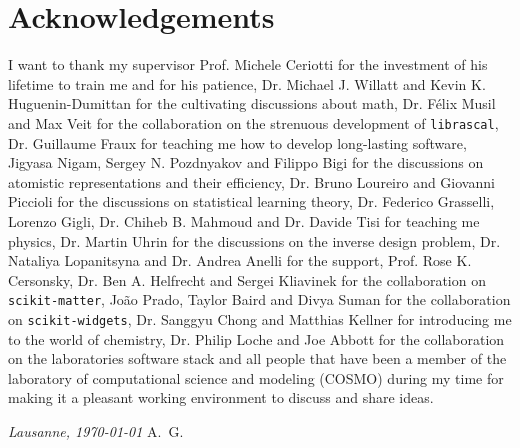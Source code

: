 \chapter*{Acknowledgements}
I want to thank my supervisor Prof. Michele Ceriotti for the investment of his lifetime to train me and for his patience, 
Dr. Michael J. Willatt and Kevin K. Huguenin-Dumittan for the cultivating discussions about math, Dr. Félix Musil and Max Veit for the collaboration on the strenuous development of \texttt{librascal}, Dr. Guillaume Fraux for teaching me how to develop long-lasting software, Jigyasa Nigam, Sergey N. Pozdnyakov and Filippo Bigi for the discussions on atomistic representations and their efficiency, Dr. Bruno Loureiro and Giovanni Piccioli for the discussions on statistical learning theory, Dr. Federico Grasselli, Lorenzo Gigli, Dr. Chiheb B. Mahmoud and Dr. Davide Tisi for teaching me physics, Dr. Martin Uhrin for the discussions on the inverse design problem, Dr. Nataliya Lopanitsyna and Dr. Andrea Anelli for the support, Prof. Rose K. Cersonsky, Dr. Ben A. Helfrecht and Sergei Kliavinek for the collaboration on \texttt{scikit-matter}, João Prado, Taylor Baird and Divya Suman for the collaboration on \texttt{scikit-widgets}, Dr. Sanggyu Chong and Matthias Kellner for introducing me to the world of chemistry, Dr. Philip Loche and Joe Abbott for the collaboration on the laboratories software stack and all people that have been a member of the laboratory of computational science and modeling (COSMO) during my time for making it a pleasant working environment to discuss and share ideas.

%
%
%
%

\bigskip
 
\noindent\textit{Lausanne, \today}
\hfill A.~G.
